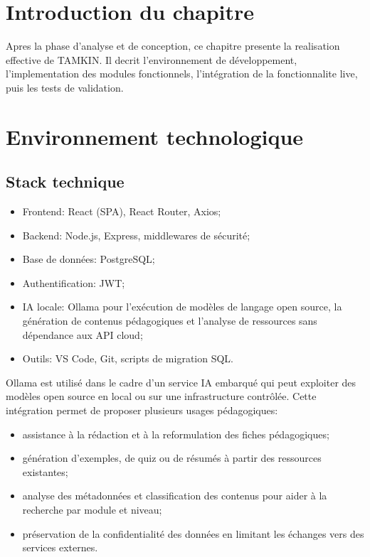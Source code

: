\documentclass[12pt,a4paper,oneside]{report}
\begin{document}
\section{Introduction du chapitre}

Apres la phase d'analyse et de conception, ce chapitre presente la realisation effective de TAMKIN. Il decrit l'environnement de développement, l'implementation des modules fonctionnels, l'intégration de la fonctionnalite live, puis les tests de validation.

\section{Environnement technologique}

\subsection{Stack technique}

\begin{itemize}
  \item Frontend: React (SPA), React Router, Axios;
  \item Backend: Node.js, Express, middlewares de sécurité;
  \item Base de données: PostgreSQL;
  \item Authentification: JWT;
  \item IA locale: Ollama pour l'exécution de modèles de langage open source, la génération de contenus pédagogiques et l'analyse de ressources sans dépendance aux API cloud;
  \item Outils: VS Code, Git, scripts de migration SQL.
\end{itemize}

Ollama est utilisé dans le cadre d'un service IA embarqué qui peut exploiter des modèles open source en local ou sur une infrastructure contrôlée. Cette intégration permet de proposer plusieurs usages pédagogiques:
\begin{itemize}
  \item assistance à la rédaction et à la reformulation des fiches pédagogiques;
  \item génération d'exemples, de quiz ou de résumés à partir des ressources existantes;
  \item analyse des métadonnées et classification des contenus pour aider à la recherche par module et niveau;
  \item préservation de la confidentialité des données en limitant les échanges vers des services externes.
\end{itemize}
\end{document}
